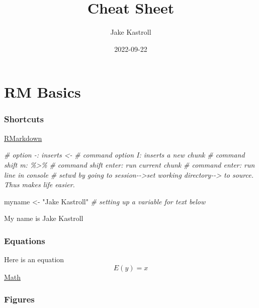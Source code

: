 \documentclass[
]{article}
\title{Cheat Sheet}
\author{Jake Kastroll}
\date{2022-09-22}
\newenvironment{Shaded}{\begin{snugshade}}{\end{snugshade}}
\newcommand{\CommentTok}[1]{\textcolor[rgb]{0.56,0.35,0.01}{\textit{#1}}}
\newcommand{\NormalTok}[1]{#1}
\newcommand{\OtherTok}[1]{\textcolor[rgb]{0.56,0.35,0.01}{#1}}
\newcommand{\StringTok}[1]{\textcolor[rgb]{0.31,0.60,0.02}{#1}}
\begin{document}
\maketitle

\hypertarget{rm-basics}{%
\section{RM Basics}\label{rm-basics}}

\hypertarget{shortcuts}{%
\subsubsection{Shortcuts}\label{shortcuts}}

\href{https://www.rstudio.com/wp-content/uploads/2015/02/rmarkdown-cheatsheet.pdf}{RMarkdown}

\begin{Shaded}
\begin{Highlighting}[]
\CommentTok{\# option {-}: inserts \textless{}{-} }
\CommentTok{\# command option I: inserts a new chunk}
\CommentTok{\# command shift m: \%\textgreater{}\% }
\CommentTok{\# command shift enter: run current chunk}
\CommentTok{\# command enter: run line in console}
\CommentTok{\# setwd by going to session{-}{-}\textgreater{}set working directory{-}{-}\textgreater{} to source. Thus makes life easier.}
\end{Highlighting}
\end{Shaded}

\begin{Shaded}
\begin{Highlighting}[]
\NormalTok{myname }\OtherTok{\textless{}{-}} \StringTok{"Jake Kastroll"}
\CommentTok{\# setting up a variable for text below}
\end{Highlighting}
\end{Shaded}

My name is Jake Kastroll

\hypertarget{equations}{%
\subsubsection{Equations}\label{equations}}

Here is an equation \[E(y)=x \]
\href{https://www.codecogs.com/eqnedit.php}{Math}

\hypertarget{figures}{%
\subsubsection{Figures}\label{figures}}
\end{document}
